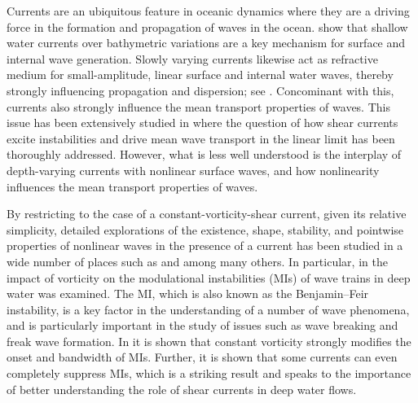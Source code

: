 \documentclass{JFM_Style/jfm}
\begin{document}
Currents are an ubiquitous feature in oceanic dynamics where they are a driving force in the formation and propagation of waves in the ocean.  \cite{helfrich} show that shallow water currents over bathymetric variations are a key mechanism for surface and internal wave generation.  Slowly varying currents likewise act as refractive medium for small-amplitude, linear surface and internal water waves, thereby strongly influencing propagation and dispersion; see \cite{mcwilliams,buhler,young}.  Concominant with this, currents also strongly influence the mean transport properties of waves.  This issue has been extensively studied in \cite{craik1,craik2,craik3,craik4,phillips1,phillips2} where the question of how shear currents excite instabilities and drive mean wave transport in the linear limit has been thoroughly addressed.  However, what is less well understood is the interplay of depth-varying currents with nonlinear surface waves, and how nonlinearity influences the mean transport properties of waves.  

By restricting to the case of a constant-vorticity-shear current, given its relative simplicity, detailed explorations of the existence, shape, stability, and pointwise properties of nonlinear waves in the presence of a current has been studied in a wide number of places such as \cite{freeman,brevik,simmen,pullin2,pullin3,dasilva,baumstein,choi,wahlen,wahlen2,constantin,thomas2012nonlinear,vasan2014pressure} and \cite{nachbin} among many others. In particular, in \cite{thomas2012nonlinear} the impact of vorticity on the modulational instabilities (MIs) of wave trains in deep water was examined.  The MI, which is also known as the Benjamin--Feir instability, is a key factor in the understanding of a number of wave phenomena, and is particularly important in the study of issues such as wave breaking and freak wave formation.  In \cite{thomas2012nonlinear} it is shown that constant vorticity strongly modifies the onset and bandwidth of MIs. Further, it is shown that some currents can even completely suppress MIs, which is a striking result and speaks to the importance of better understanding the role of shear currents in deep water flows.
\end{document}
